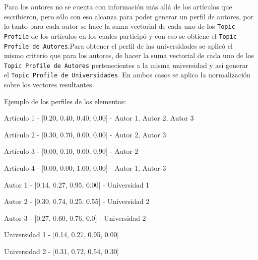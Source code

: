 Para los autores no se cuenta con información más allá de los artículos que escribieron, pero sólo con eso alcanza para poder generar un perfil de autores, por lo tanto para cada autor se hace la suma vectorial de cada uno de los \texttt{Topic Profile} de los artículos en los cuales participó y con eso se obtiene el \texttt{Topic Profile de Autores}.Para obtener el perfil de las universidades se aplicó el mismo criterio que para los autores, de hacer la suma vectorial de cada uno de los \texttt{Topic Profile de Autores} pertenecientes a la misma universidad y así generar el \texttt{Topic Profile de Universidades}. En ambos casos se aplica la normalización sobre los vectores resultantes.

Ejemplo de los perfiles de los elementos:
\begin{description}
 \item[Artículo - Topic Profile - Autores]
 \item Artículo 1 - $[$0.20, 0.40, 0.40, 0.00$]$ - Autor 1, Autor 2, Autor 3
 \item Artículo 2 - $[$0.30, 0.70, 0.00, 0.00$]$ - Autor 2, Autor 3
 \item Artículo 3 - $[$0.00, 0.10, 0.00, 0.90$]$ - Autor 2
 \item Artículo 4 - $[$0.00, 0.00, 1.00, 0.00$]$ - Autor 1, Autor 3
\end{description}

\begin{description}
 \item[Autor - Topic Profile - Universidad]
 \item Autor 1 - $[$0.14, 0.27, 0.95, 0.00$]$ - Universidad 1
 \item Autor 2 - $[$0.30, 0.74, 0.25, 0.55$]$ - Universidad 2
 \item Autor 3 - $[$0.27, 0.60, 0.76, 0.0$]$ - Universidad 2
\end{description}

\begin{description}
 \item[Universidad - Topic Profile]
 \item Universidad 1 - $[$0.14, 0.27, 0.95, 0.00$]$
 \item Universidad 2 - $[$0.31, 0.72, 0.54, 0.30$]$
\end{description}

